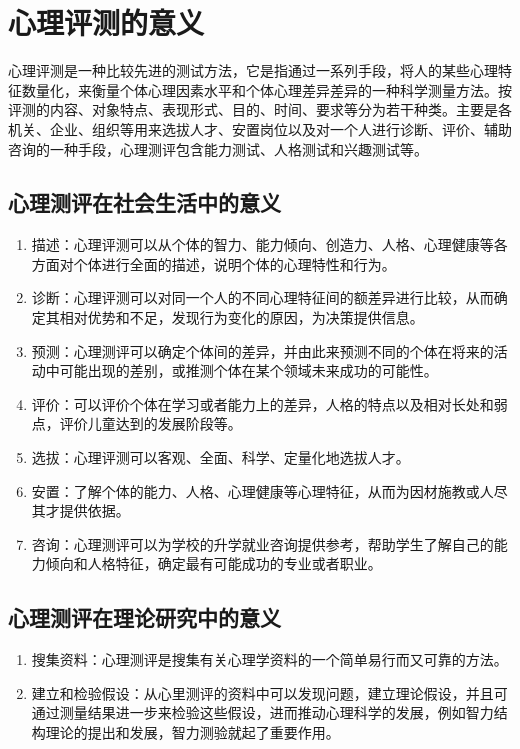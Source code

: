 \section{心理评测的意义}

心理评测是一种比较先进的测试方法，它是指通过一系列手段，将人的某些心理特征数量化，来衡量个体心理因素水平和个体心理差异差异的一种科学测量方法。按评测的内容、对象特点、表现形式、目的、时间、要求等分为若干种类。主要是各机关、企业、组织等用来选拔人才、安置岗位以及对一个人进行诊断、评价、辅助咨询的一种手段，心理测评包含能力测试、人格测试和兴趣测试等。

\subsection{心理测评在社会生活中的意义}

\begin{enumerate}
\item 描述：心理评测可以从个体的智力、能力倾向、创造力、人格、心理健康等各方面对个体进行全面的描述，说明个体的心理特性和行为。
\item 诊断：心理评测可以对同一个人的不同心理特征间的额差异进行比较，从而确定其相对优势和不足，发现行为变化的原因，为决策提供信息。
\item 预测：心理测评可以确定个体间的差异，并由此来预测不同的个体在将来的活动中可能出现的差别，或推测个体在某个领域未来成功的可能性。
\item 评价：可以评价个体在学习或者能力上的差异，人格的特点以及相对长处和弱点，评价儿童达到的发展阶段等。
\item 选拔：心理评测可以客观、全面、科学、定量化地选拔人才。
\item 安置：了解个体的能力、人格、心理健康等心理特征，从而为因材施教或人尽其才提供依据。
\item 咨询：心理测评可以为学校的升学就业咨询提供参考，帮助学生了解自己的能力倾向和人格特征，确定最有可能成功的专业或者职业。
\end{enumerate}

\subsection{心理测评在理论研究中的意义}

\begin{enumerate}
\item 搜集资料：心理测评是搜集有关心理学资料的一个简单易行而又可靠的方法。
\item 建立和检验假设：从心里测评的资料中可以发现问题，建立理论假设，并且可通过测量结果进一步来检验这些假设，进而推动心理科学的发展，例如智力结构理论的提出和发展，智力测验就起了重要作用。
\end{enumerate}

